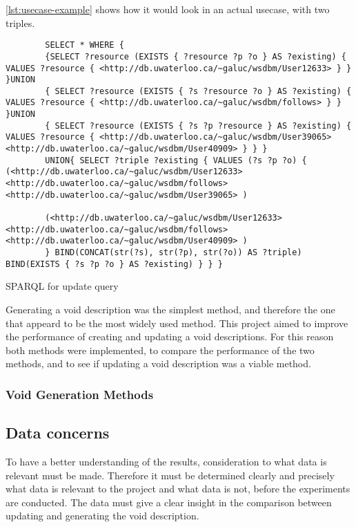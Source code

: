 \autoref{lst:usecase-example} shows how it would look in an actual usecase, with two triples.
\begin{listing}[!ht]
    \begin{verbatim}          
        SELECT * WHERE { 
        {SELECT ?resource (EXISTS { ?resource ?p ?o } AS ?existing) { VALUES ?resource { <http://db.uwaterloo.ca/~galuc/wsdbm/User12633> } } }UNION 
        { SELECT ?resource (EXISTS { ?s ?resource ?o } AS ?existing) { VALUES ?resource { <http://db.uwaterloo.ca/~galuc/wsdbm/follows> } } }UNION 
        { SELECT ?resource (EXISTS { ?s ?p ?resource } AS ?existing) { VALUES ?resource { <http://db.uwaterloo.ca/~galuc/wsdbm/User39065> <http://db.uwaterloo.ca/~galuc/wsdbm/User40909> } } }
        UNION{ SELECT ?triple ?existing { VALUES (?s ?p ?o) {  (<http://db.uwaterloo.ca/~galuc/wsdbm/User12633>   <http://db.uwaterloo.ca/~galuc/wsdbm/follows>   <http://db.uwaterloo.ca/~galuc/wsdbm/User39065> )

        (<http://db.uwaterloo.ca/~galuc/wsdbm/User12633>       <http://db.uwaterloo.ca/~galuc/wsdbm/follows>   <http://db.uwaterloo.ca/~galuc/wsdbm/User40909> ) 
        } BIND(CONCAT(str(?s), str(?p), str(?o)) AS ?triple) BIND(EXISTS { ?s ?p ?o } AS ?existing) } } } 
    \end{verbatim}
    \caption{SPARQL for update query}
    \label{lst:usecase-example}
\end{listing}


Generating a \gls{void} description was the simplest method, and therefore the one that appeard to be the most widely used method. This project aimed to improve the performance of creating and updating a \gls{void} descriptions. For this reason both methods were implemented, to compare the performance of the two methods, and to see if updating a \gls{void} description was a viable method.
\subsubsection{Void Generation Methods}\label{sec:voidmethods}


\subsection{Data concerns}\label{sec:concerns}
To have a better understanding of the results, consideration to what data is relevant must be made. Therefore it must be determined clearly and precisely what data is relevant to the project and what data is not, before the experiments are conducted. The data must give a clear insight in the comparison between updating and generating the \gls{void} description.

